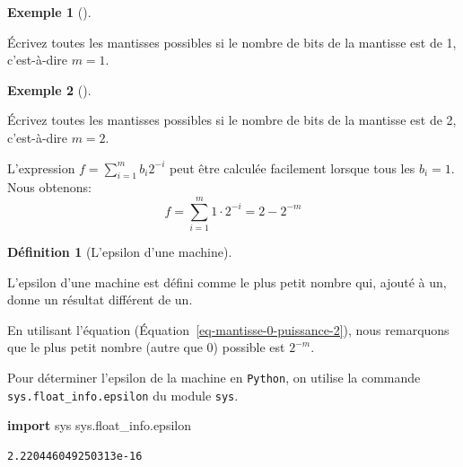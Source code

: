 \documentclass[
  letterpaper,
]{scrbook}
\newenvironment{Shaded}{\begin{snugshade}}{\end{snugshade}}
\newcommand{\ImportTok}[1]{\textcolor[rgb]{0.00,0.50,0.00}{\textbf{#1}}}
\newcommand{\NormalTok}[1]{\textcolor[rgb]{0.00,0.44,0.13}{#1}}
\theoremstyle{plain}
\theoremstyle{definition}
\newtheorem{definition}{Définition}[chapter]
\theoremstyle{definition}
\newtheorem{example}{Exemple}[chapter]
\theoremstyle{remark}
\begin{document}
\begin{example}[]\protect\hypertarget{exm-virgule-flottante-1-bit}{}\label{exm-virgule-flottante-1-bit}

Écrivez toutes les mantisses possibles si le nombre de bits de la
mantisse est de 1, c'est-à-dire \(m=1\).

\end{example}

\begin{example}[]\protect\hypertarget{exm-virgule-flottante-2-bits}{}\label{exm-virgule-flottante-2-bits}

Écrivez toutes les mantisses possibles si le nombre de bits de la
mantisse est de 2, c'est-à-dire \(m=2\).

\end{example}

\begin{tcolorbox}[enhanced jigsaw, colbacktitle=quarto-callout-note-color!10!white, toptitle=1mm, left=2mm, toprule=.15mm, opacityback=0, bottomrule=.15mm, breakable, coltitle=black, title=\textcolor{quarto-callout-note-color}{\faInfo}\hspace{0.5em}{Note}, colframe=quarto-callout-note-color-frame, arc=.35mm, titlerule=0mm, rightrule=.15mm, opacitybacktitle=0.6, leftrule=.75mm, bottomtitle=1mm, colback=white]

L'expression \(f = \sum_{i=1}^{m} b_i 2^{-i}\) peut être calculée
facilement lorsque tous les \(b_i=1\). Nous obtenons: \[
f = \sum_{i=1}^{m} 1 \cdot 2^{-i} = 2-2^{-m}
\]

\end{tcolorbox}

\begin{definition}[L'epsilon d'une
machine]\protect\hypertarget{def-epsilon-machine}{}\label{def-epsilon-machine}

L'epsilon d'une machine est défini comme le plus petit nombre qui,
ajouté à un, donne un résultat différent de un.

En utilisant l'équation (Équation~\ref{eq-mantisse-0-puissance-2}), nous
remarquons que le plus petit nombre (autre que 0) possible est
\(2^{-m}\).

Pour déterminer l'epsilon de la machine en \texttt{Python}, on utilise
la commande \texttt{sys.float\_info.epsilon} du module \texttt{sys}.

\begin{Shaded}
\begin{Highlighting}[]
\ImportTok{import}\NormalTok{ sys}
\NormalTok{sys.float\_info.epsilon}
\end{Highlighting}
\end{Shaded}

\begin{verbatim}
2.220446049250313e-16
\end{verbatim}

\end{definition}
\end{document}
